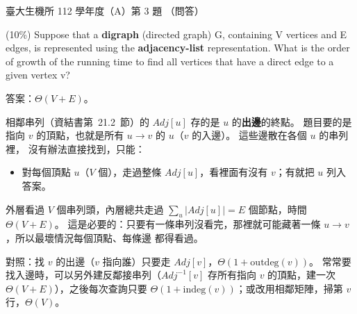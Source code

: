 \begin{pastexam}[label={px:ntu-112-bime-ds-03}]{臺大生機所 112 學年度（A）第 3 題}
（問答）

(10\%) Suppose that a \textbf{digraph} (directed graph) G, containing V vertices and E edges, is
represented using the \textbf{adjacency-list} representation. What is the order of growth of the
running time to find all vertices that have a direct edge to a given vertex v?
\end{pastexam}

\begin{pastsoln}
答案：$\Theta(V + E)$。

相鄰串列（資結書第~21.2~節）的 $\mathit{Adj}[u]$ 存的是 $u$ 的\textbf{出邊}的終點。 題目要的是
指向 $v$ 的頂點，也就是所有 $u \to v$ 的 $u$（$v$ 的入邊）。 這些邊散在各個 $u$ 的串列裡，
沒有辦法直接找到，只能：
\begin{itemize}
\item 對每個頂點 $u$（$V$ 個），走過整條 $\mathit{Adj}[u]$，看裡面有沒有 $v$；有就把 $u$ 列入答案。
\end{itemize}
外層看過 $V$ 個串列頭，內層總共走過 $\sum_u |\mathit{Adj}[u]| = E$ 個節點，時間 $\Theta(V + E)$。
這是必要的：只要有一條串列沒看完，那裡就可能藏著一條 $u \to v$，所以最壞情況每個頂點、每條邊
都得看過。

對照：找 $v$ 的出邊（$v$ 指向誰）只要走 $\mathit{Adj}[v]$，$\Theta(1 + \mathrm{outdeg}(v))$。
常常要找入邊時，可以另外建反鄰接串列（$\mathit{Adj}^{-1}[v]$ 存所有指向 $v$ 的頂點，建一次
$\Theta(V + E)$），之後每次查詢只要 $\Theta(1 + \mathrm{indeg}(v))$；或改用相鄰矩陣，掃第 $v$
行，$\Theta(V)$。
\end{pastsoln}

